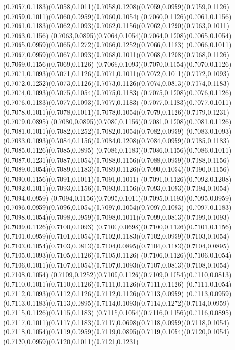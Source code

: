 (0.7057,0.1183)(0.7058,0.1011)(0.7058,0.1208)(0.7059,0.0959)(0.7059,0.1126)(0.7059,0.1011)(0.7060,0.0959)(0.7060,0.1054)
(0.7060,0.1126)(0.7061,0.1156)(0.7061,0.1183)(0.7062,0.1093)(0.7062,0.1156)(0.7062,0.1290)(0.7063,0.1011)(0.7063,0.1156)
(0.7063,0.0895)(0.7064,0.1054)(0.7064,0.1208)(0.7065,0.1054)(0.7065,0.0959)(0.7065,0.1272)(0.7066,0.1252)(0.7066,0.1183)
(0.7066,0.1011)(0.7067,0.0959)(0.7067,0.1093)(0.7068,0.1011)(0.7068,0.1208)(0.7068,0.1126)(0.7069,0.1156)(0.7069,0.1126)
(0.7069,0.1093)(0.7070,0.1054)(0.7070,0.1126)(0.7071,0.1093)(0.7071,0.1126)(0.7071,0.1011)(0.7072,0.1011)(0.7072,0.1093)
(0.7072,0.1252)(0.7073,0.1126)(0.7073,0.1126)(0.7074,0.0813)(0.7074,0.1183)(0.7074,0.1093)(0.7075,0.1054)(0.7075,0.1183)
(0.7075,0.1208)(0.7076,0.1126)(0.7076,0.1183)(0.7077,0.1093)(0.7077,0.1183)
\PST@Solid(0.7077,0.1183)(0.7077,0.1011)(0.7078,0.1011)(0.7078,0.1011)(0.7078,0.1054)(0.7079,0.1126)(0.7079,0.1231)(0.7079,0.0895)
(0.7080,0.0895)(0.7080,0.1156)(0.7081,0.1208)(0.7081,0.1126)(0.7081,0.1011)(0.7082,0.1252)(0.7082,0.1054)(0.7082,0.0959)
(0.7083,0.1093)(0.7083,0.1093)(0.7084,0.1156)(0.7084,0.1208)(0.7084,0.0959)(0.7085,0.1183)(0.7085,0.1126)(0.7085,0.0895)
(0.7086,0.1183)(0.7086,0.1156)(0.7086,0.1011)(0.7087,0.1231)(0.7087,0.1054)(0.7088,0.1156)(0.7088,0.0959)(0.7088,0.1156)
(0.7089,0.1054)(0.7089,0.1183)(0.7089,0.1126)(0.7090,0.1054)(0.7090,0.1156)(0.7090,0.1156)(0.7091,0.1011)(0.7091,0.1011)
(0.7091,0.1126)(0.7092,0.1208)(0.7092,0.1011)(0.7093,0.1156)(0.7093,0.1156)(0.7093,0.1093)(0.7094,0.1054)(0.7094,0.0959)
(0.7094,0.1156)(0.7095,0.1011)(0.7095,0.1093)(0.7095,0.0959)(0.7096,0.0959)(0.7096,0.1054)(0.7097,0.1054)(0.7097,0.1093)
(0.7097,0.1183)(0.7098,0.1054)(0.7098,0.0959)(0.7098,0.1011)(0.7099,0.0813)(0.7099,0.1093)(0.7099,0.1126)(0.7100,0.1093)
(0.7100,0.0698)(0.7100,0.1126)(0.7101,0.1156)(0.7101,0.0959)(0.7101,0.1054)(0.7102,0.1183)(0.7102,0.0959)(0.7103,0.1054)
(0.7103,0.1054)(0.7103,0.0813)(0.7104,0.0895)(0.7104,0.1183)(0.7104,0.0895)(0.7105,0.1093)(0.7105,0.1126)(0.7105,0.1126)
(0.7106,0.1126)(0.7106,0.1054)(0.7106,0.1011)(0.7107,0.1054)(0.7107,0.1093)(0.7107,0.0813)(0.7108,0.1054)(0.7108,0.1054)
(0.7109,0.1252)(0.7109,0.1126)(0.7109,0.1054)(0.7110,0.0813)(0.7110,0.1011)(0.7110,0.1126)(0.7111,0.1126)(0.7111,0.1126)
(0.7111,0.1054)(0.7112,0.1093)(0.7112,0.1126)(0.7112,0.1126)(0.7113,0.0959)
\PST@Solid(0.7113,0.0959)(0.7113,0.1183)(0.7113,0.0895)(0.7114,0.1093)(0.7114,0.1272)(0.7114,0.0959)(0.7115,0.1126)(0.7115,0.1183)
(0.7115,0.1054)(0.7116,0.1156)(0.7116,0.0895)(0.7117,0.1011)(0.7117,0.1183)(0.7117,0.0698)(0.7118,0.0959)(0.7118,0.1054)
(0.7118,0.1054)(0.7119,0.0959)(0.7119,0.0895)(0.7119,0.1054)(0.7120,0.1054)(0.7120,0.0959)(0.7120,0.1011)(0.7121,0.1231)
